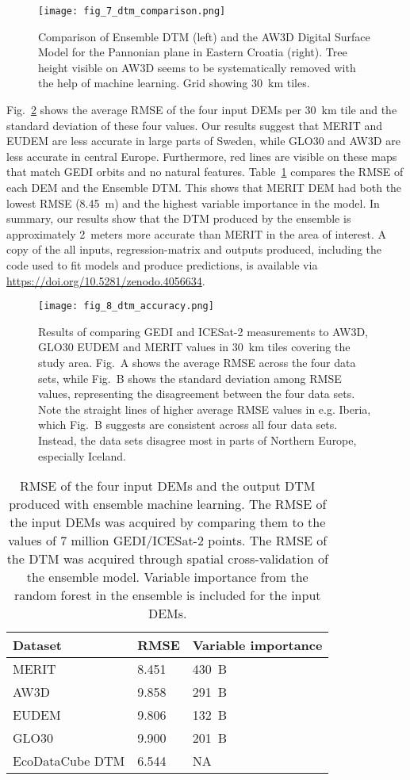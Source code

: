 \begin{figure}[hbt]
\centering
\texttt{[image: fig\_7\_dtm\_comparison.png]}
\caption{Comparison of Ensemble DTM (left) and the AW3D Digital Surface Model for the Pannonian plane in Eastern Croatia (right). Tree height visible on AW3D seems to be systematically removed with the help of machine learning. Grid showing 30~km tiles.}
\label{fig:7_dtm_comparison}
\end{figure}

Fig.\@~\ref{fig:8_dtm_accuracy} shows the average RMSE of the four input DEMs per 30\@~km tile and the standard deviation of these four values. Our results suggest that MERIT and EUDEM are  less accurate in large parts of Sweden, while GLO30 and AW3D are less accurate in central Europe. Furthermore, red lines are visible on these maps that match GEDI orbits and no natural features. Table~\ref{tab:dem-accuracy} compares the RMSE of each DEM and the Ensemble DTM. This shows that MERIT DEM had both the lowest RMSE (8.45~m) and the highest variable importance in the model. In summary, our results show that the DTM produced by the ensemble is approximately 2~meters more accurate than MERIT in the area of interest. A copy of the all inputs, regression-matrix and outputs produced, including the code used to fit models and produce predictions, is available via \url{https://doi.org/10.5281/zenodo.4056634}.

\begin{figure}[!hbt]
    \texttt{[image: fig\_8\_dtm\_accuracy.png]}
    \caption{Results of comparing GEDI and ICESat-2 measurements to AW3D, GLO30 EUDEM and MERIT values in 30\@~km tiles covering the study area. Fig.\@~A shows the average RMSE across the four data sets, while Fig.\@~B shows the standard deviation among RMSE values, representing the disagreement between the four data sets. Note the straight lines of higher average RMSE values in e.g. Iberia, which Fig.\@~B suggests are consistent across all four data sets. Instead, the data sets disagree most in parts of Northern Europe, especially Iceland.} 
    \label{fig:8_dtm_accuracy}
\end{figure}      

\begin{table}[hbt]
\centering
\caption{RMSE of the four input DEMs and the output DTM produced with ensemble machine learning. The RMSE of the input DEMs was acquired by comparing them to the values of 7 million GEDI/ICESat-2 points. The RMSE of the DTM was acquired through spatial cross-validation of the ensemble model. Variable importance from the random forest in the ensemble is included for the input DEMs.}
\label{tab:dem-accuracy}
\begin{tabular}{@{}lll@{}}
\hline
Dataset & RMSE  & Variable importance   \\ 
\hline
MERIT   & 8.451 & 430~B \\
AW3D    & 9.858 & 291~B \\
EUDEM   & 9.806 & 132~B \\
GLO30   & 9.900 & 201~B \\
\hline
EcoDataCube DTM & 6.544 & NA    \\ 
\hline
\end{tabular}
\end{table}
